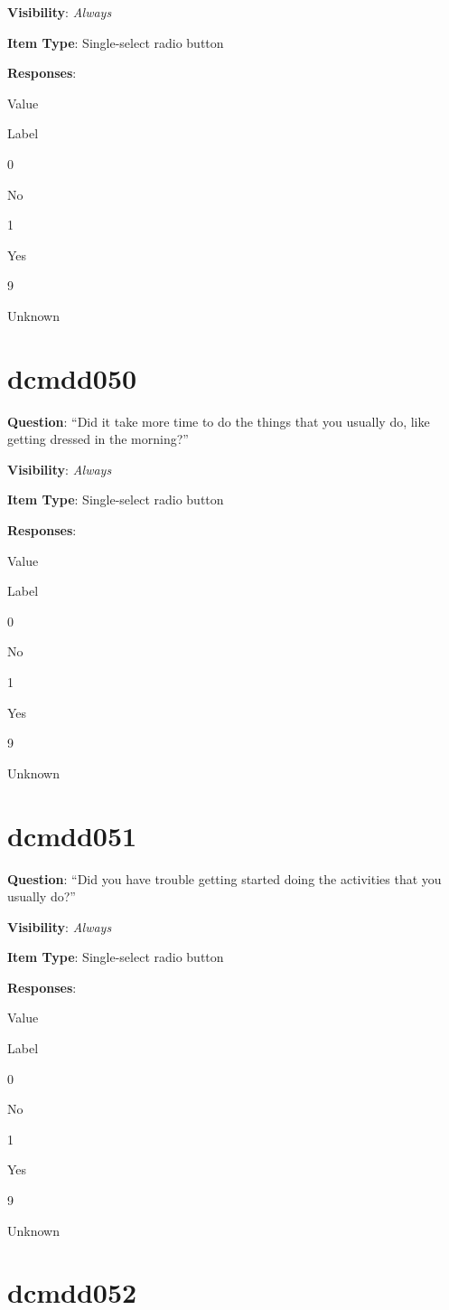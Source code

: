 \documentclass[
]{book}
\begin{document}
\textbf{Visibility}: \emph{Always}

\textbf{Item Type}: Single-select radio button

\textbf{Responses}:

Value

Label

0

No

1

Yes

9

Unknown

\hypertarget{dcmdd050}{%
\section{dcmdd050}\label{dcmdd050}}

\textbf{Question}: ``Did it take more time to do the things that you usually do, like getting dressed in the morning?''

\textbf{Visibility}: \emph{Always}

\textbf{Item Type}: Single-select radio button

\textbf{Responses}:

Value

Label

0

No

1

Yes

9

Unknown

\hypertarget{dcmdd051}{%
\section{dcmdd051}\label{dcmdd051}}

\textbf{Question}: ``Did you have trouble getting started doing the activities that you usually do?''

\textbf{Visibility}: \emph{Always}

\textbf{Item Type}: Single-select radio button

\textbf{Responses}:

Value

Label

0

No

1

Yes

9

Unknown

\hypertarget{dcmdd052}{%
\section{dcmdd052}\label{dcmdd052}}
\end{document}
